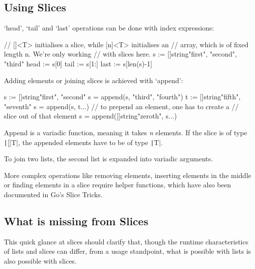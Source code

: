 \subsection{Using Slices}

`head', `tail' and `last' operations can be done with index expressions:

\begin{gocode}
// []<T> initialises a slice, while [n]<T> initialises an
// array, which is of fixed length n. We're only working
// with slices here.
s := []string{"first", "second", "third"}
head := s[0]
tail := s[1:]
last := s[len(s)-1]
\end{gocode}

Adding elements or joining slices is achieved with `append':

\begin{gocode}
s := []string{"first", "second"}
s = append(s, "third", "fourth")
t := []string{"fifth", "seventh"}
s = append(s, t...)
// to prepend an element, one has to create a
// slice out of that element
s = append([]string{"zeroth"}, s...)
\end{gocode}

Append is a variadic function, meaning it takes \textit{n} elements. If the slice is of type \texttt|[]T|,
the appended elements have to be of type \texttt|T|.

To join two lists, the second list is expanded into
variadic arguments.

More complex operations like removing elements, inserting elements in the middle or finding
elements in a slice require helper functions, which have also been documented in Go's
Slice Tricks\autocite{slice-tricks}.

\subsection{What is missing from Slices}

This quick glance at slices should clarify that, though the runtime characteristics of lists and slices
can differ, from a usage standpoint, what is possible with lists is also possible with slices.

